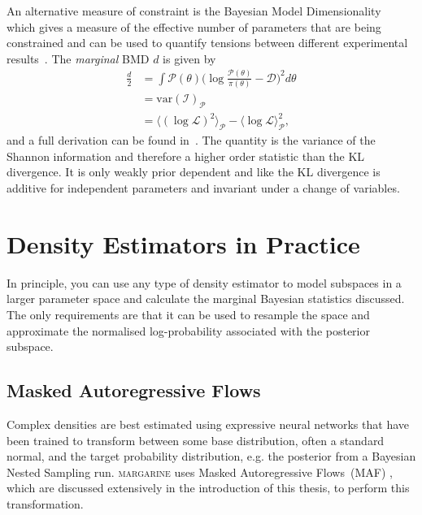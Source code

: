 An alternative measure of constraint is the Bayesian Model Dimensionality~\cite{Handley_dimensionality_2019} which gives a measure of the effective number of parameters that are being constrained and can be used to quantify tensions between different experimental results~\cite{Handley_tensions_2019,2022arXiv220505892G}.
The \emph{marginal} BMD $d$ is given by
\begin{equation}
    \begin{split}
    \frac{d}{2} &= \int \mathcal{P}(\theta) \bigg(\log\frac{\mathcal{P}(\theta)}{\pi(\theta)} - \mathcal{D}\bigg)^2 d\theta \\
    & = \mathrm{var}(\mathcal{I})_\mathcal{P} \\
    & = \langle(\log \mathcal{L})^2\rangle_\mathcal{P} - \langle\log\mathcal{L}\rangle_\mathcal{P}^2,
    \end{split}
    \label{eq:bayesian_dimensionality}
\end{equation}
and a full derivation can be found in~\cite{Handley_dimensionality_2019}. 
The quantity is the variance of the Shannon information and therefore a higher order statistic than the KL divergence.
It is only weakly prior dependent and like the KL divergence is additive for independent parameters and invariant under a change of variables.

\section{Density Estimators in Practice}
\label{sec:density_estimators}

In principle, you can use any type of density estimator to model subspaces in a larger parameter space and calculate the marginal Bayesian statistics discussed. The only requirements are that it can be used to resample the space and approximate the normalised log-probability associated with the posterior subspace.

\subsection{Masked Autoregressive Flows}

Complex densities are best estimated using expressive neural networks that have been trained to transform between some base distribution, often a standard normal, and the target probability distribution, e.g. the posterior from a Bayesian Nested Sampling run. \textsc{margarine} uses Masked Autoregressive Flows~(MAF) \cite{Papamarkarios_MAF_2017}, which are discussed extensively in the introduction of this thesis, to perform this transformation.%

